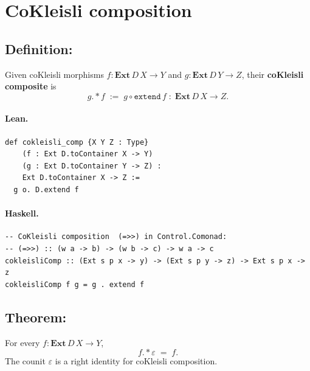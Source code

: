 \documentclass[11pt,a4paper]{article}
\begin{document}
\section{CoKleisli composition}

\subsection{Definition: }

\begin{defn}
Given coKleisli morphisms $f : \mathbf{Ext}\,D\,X \to Y$ and
$g : \mathbf{Ext}\,D\,Y \to Z$, their \textbf{coKleisli composite} is
\[
  g \mathbin{.*} f \;:=\; g \circ \mathtt{extend}\,f
  \;:\; \mathbf{Ext}\,D\,X \to Z.
\]
\end{defn}

\paragraph{Lean.}
\begin{lstlisting}[style=lean]
def cokleisli_comp {X Y Z : Type}
    (f : Ext D.toContainer X -> Y)
    (g : Ext D.toContainer Y -> Z) :
    Ext D.toContainer X -> Z :=
  g o. D.extend f
\end{lstlisting}

\paragraph{Haskell.}
\begin{lstlisting}[style=haskell]
-- CoKleisli composition  (=>>) in Control.Comonad:
-- (=>>) :: (w a -> b) -> (w b -> c) -> w a -> c
cokleisliComp :: (Ext s p x -> y) -> (Ext s p y -> z) -> Ext s p x -> z
cokleisliComp f g = g . extend f
\end{lstlisting}


\subsection{Theorem: }

\begin{thm}
For every $f : \mathbf{Ext}\,D\,X \to Y$,
\[
  f \mathbin{.*} \varepsilon \;=\; f.
\]
The counit $\varepsilon$ is a right identity for coKleisli composition.
\end{thm}
\end{document}
